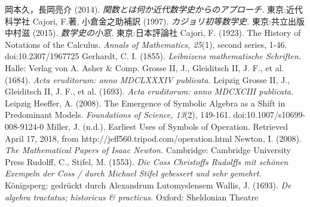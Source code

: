\documentclass[8pt,a4j]{jreport}
\begin{document}
\begin{thebibliography}{99}
岡本久，長岡亮介 (2014). {\it 関数とは何か\quad 近代数学史からのアプローチ.} 東京:近代科学社
Cajori, F.著, 小倉金之助補訳 (1997). {\it カジョリ初等数学史.} 東京:共立出版
中村滋 (2015). {\it 数学史の小窓.} 東京:日本評論社
Cajori, F. (1923). The History of Notations of the Calculus. {\it Annals of Mathematics, 25}(1), second series, 1-46. doi:10.2307/1967725
Gerhardt, C. I. (1855). {\it Leibnizens mathematische Schriften.} Halle: Verlag von A. Asher \& Comp.
Grosse II, J., Gleiditsch II, J. F., et al. (1684). {\it Acta eruditorum: anno MDCLXXXIV publicata.} Leipzig
Grosse II, J., Gleiditsch II, J. F., et al. (1693). {\it Acta eruditorum: anno MDCXCIII publicata.} Leipzig
Heeffer, A. (2008). The Emergence of Symbolic Algebra as a Shift in Predominant Models. {\it Foundations of Science, 13}(2), 149-161. doi:10.1007/s10699-008-9124-0 
Miller, J. (n.d.). Earliest Uses of Symbols of Operation. Retrieved April 17, 2018, from http://jeff560.tripod.com/operation.html 
Newton, I. (2008). {\it The Mathematical Papers of Isaac Newton.} Cambridge: Cambridge University Press
Rudolff, C., Stifel, M. (1553). {\it Die Coss Christoffs Rudolffs mit schönen Exempeln der Coss / durch Michael Stifel gebessert und sehr gemehrt.} K\"onigsperg: gedr\"uckt durch Alexandrum Lutomyslensem
Wallis, J. (1693). {\it De algebra tractatus; historicus \& practicus.} Oxford: Sheldonian Theatre
\end{thebibliography}
\end{document}
